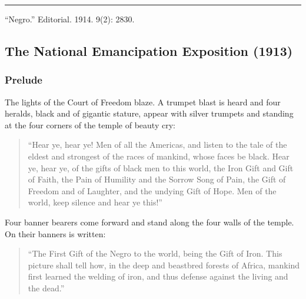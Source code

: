 \documentclass[letterpaper,10pt,english]{jupyterBook}
\begin{document}
\bigskip\hrule\bigskip


\sphinxAtStartPar
“Negro.” Editorial. 1914.  9(2): 28\sphinxhyphen{}30.


\subsection{The National Emancipation Exposition (1913)}
\label{\detokenize{Volumes/06/07/national_emancipation_exposition:the-national-emancipation-exposition-1913}}\label{\detokenize{Volumes/06/07/national_emancipation_exposition::doc}}
\sphinxAtStartPar
{}

\sphinxAtStartPar
{}


\subsubsection{Prelude}
\label{\detokenize{Volumes/06/07/national_emancipation_exposition:prelude}}
\sphinxAtStartPar
The lights of the Court of Freedom blaze. A trumpet blast is heard and four heralds, black and of gigantic stature, appear with silver trumpets and standing at the four corners of the temple of beauty cry:
\begin{quote}

\sphinxAtStartPar
“Hear ye, hear ye! Men of all the Americas, and listen to the tale of the eldest and strongest of the races of mankind, whose faces be black. Hear ye, hear ye, of the gifts of black men to this world, the Iron Gift and Gift of Faith, the Pain of Humility and the Sorrow Song of Pain, the Gift of Freedom and of Laughter, and the undying Gift of Hope. Men of the world, keep silence and hear ye this!”
\end{quote}

\sphinxAtStartPar
Four banner bearers come forward and stand along the four walls of the temple. On their banners is written:
\begin{quote}

\sphinxAtStartPar
“The First Gift of the Negro to the world, being the Gift of Iron. This picture shall tell how, in the deep and beast\sphinxhyphen{}bred forests of Africa, mankind first learned the welding of iron, and thus defense against the living and the dead.”
\end{quote}
\end{document}
